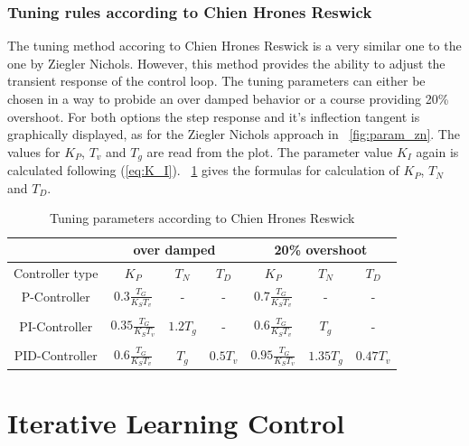 \subsubsection{Tuning rules according to Chien Hrones Reswick}
The tuning method accoring to Chien Hrones Reswick is a very similar one to the one by Ziegler Nichols. However, this method provides the ability to adjust the transient response of the control loop. The tuning parameters can either be chosen in a way to probide an over damped behavior or a course providing 20\% overshoot.
For both options the step response and it's inflection tangent is graphically displayed, as for the Ziegler Nichols approach in \figurename~\ref{fig:param_zn}.
The values for $K_{P}$, $T_{v}$ and $T_{g}$ are read from the plot. The parameter value $K_{I}$ again is calculated following (\ref{eq:K_I}). \tablename~\ref{tab:param_chr} gives the formulas for calculation of $K_{P}$,  $T_{N}$ and $T_{D}$.

\begin{table}
  \centering
  \begin{tabular}{c|ccc|ccc}
    \toprule
     & \multicolumn{3}{c|}{over damped} & \multicolumn{3}{c}{20\% overshoot} \\
    \midrule
    Controller type & $K_{P}$ &  $T_{N}$ & $T_{D}$ & $K_{P}$ &  $T_{N}$ & $T_{D}$ \\
    \midrule
    P-Controller & $0.3\frac{T_{G}}{K_{S}T_{v}}$ & - & - & $0.7\frac{T_{G}}{K_{S}T_{v}}$ & - & - \\
    & & & & & & \\
    PI-Controller & $0.35\frac{T_{G}}{K_{S}T_{v}}$ & $1.2T_{g}$ & - & $0.6\frac{T_{G}}{K_{S}T_{v}}$ & $T_{g}$ & - \\
        & & & & & & \\
    PID-Controller & $0.6\frac{T_{G}}{K_{S}T_{v}}$ & $T_{g}$ & $0.5T_{v}$ & $0.95\frac{T_{G}}{K_{S}T_{v}}$ & $1.35T_{g}$ & $0.47T_{v}$\\
    \bottomrule
\end{tabular}
  \caption[Tuning parameters Chien Hrones Reswick]{Tuning parameters according to Chien Hrones Reswick}
  \label{tab:param_chr}
\end{table}

\section{Iterative Learning Control}
